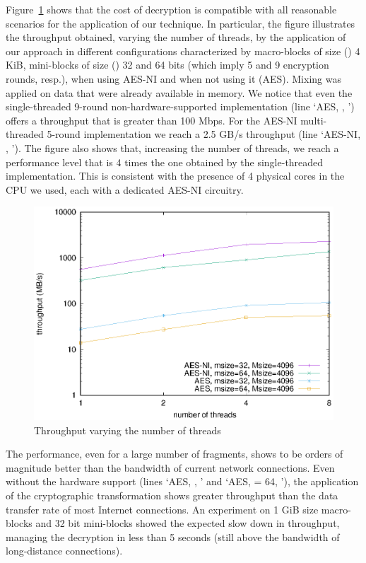 Figure~\ref{ms:fig:clientPerf} shows that the cost of decryption is compatible with all reasonable scenarios for the application of our technique. In particular, the figure illustrates the throughput obtained, varying the number of threads, by the application of our approach in different configurations characterized by macro-blocks of size (\Msize) 4 KiB, mini-blocks of size (\msize) 32 and 64 bits (which imply 5 and 9 encryption rounds, resp.), when using AES-NI and when not using it (AES). Mixing was applied on data that were already available in memory. We notice that even the single-threaded 9-round non-hardware-supported implementation (line `AES, , ') offers a throughput that is greater than 100 Mbps. For the AES-NI multi-threaded 5-round implementation we reach a 2.5 GB/s throughput (line `AES-NI, , '). The figure also shows that, increasing the number of threads, we reach a performance level that is 4 times the one obtained by the single-threaded implementation. This is consistent with the presence of 4 physical cores in the CPU we used, each with a dedicated AES-NI circuitry.

\begin{figure}
	\centering
	\includegraphics[width=0.8\columnwidth,valign=t]{figures/fig09}
	\caption{\label{ms:fig:clientPerf}Throughput varying the number of threads}
\end{figure}

The performance, even for a large number of fragments, shows to be orders of magnitude better than the bandwidth of current network connections. Even without the hardware support (lines `AES, , ' and `AES, \msize= 64, '), the application of the cryptographic transformation shows greater throughput than the data transfer rate of most Internet connections. An experiment on 1 GiB size macro-blocks and 32 bit mini-blocks showed the expected slow down in throughput, managing the decryption in less than 5 seconds (still above the bandwidth of long-distance connections).


